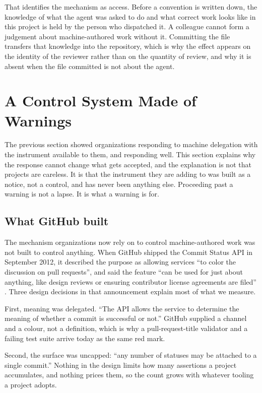 \documentclass[mnsc]{informs4}
\begin{document}
That identifies the mechanism as access. Before a convention is written down, the
knowledge of what the agent was asked to do and what correct work looks like in
this project is held by the person who dispatched it. A colleague cannot form a
judgement about machine-authored work without it. Committing the file transfers
that knowledge into the repository, which is why the effect appears on the
identity of the reviewer rather than on the quantity of review, and why it is
absent when the file committed is not about the agent.

\section{A Control System Made of Warnings}
\label{sec:warnings}

The previous section showed organizations responding to machine delegation with
the instrument available to them, and responding well. This section explains why
the response cannot change what gets accepted, and the explanation is not that
projects are careless. It is that the instrument they are adding to was built as a
notice, not a control, and has never been anything else. Proceeding past a warning
is not a lapse. It is what a warning is for.
\label{sec:enforcement}

\subsection{What GitHub built}
\label{sec:origin}

The mechanism organizations now rely on to control machine-authored work was not
built to control anything. When GitHub shipped the Commit Status API in September
2012, it described the purpose as allowing services ``to color the discussion on
pull requests'', and said the feature ``can be used for just about anything, like
design reviews or ensuring contributor license agreements are filed''
\citep{github2012status}. Three design decisions in that announcement explain most
of what we measure.

First, meaning was delegated. ``The API allows the service to determine the meaning
of whether a commit is successful or not.'' GitHub supplied a channel and a colour,
not a definition, which is why a pull-request-title validator and a failing test
suite arrive today as the same red mark.

Second, the surface was uncapped: ``any number of statuses may be attached to a
single commit.'' Nothing in the design limits how many assertions a project
accumulates, and nothing prices them, so the count grows with whatever tooling a
project adopts.
\end{document}
